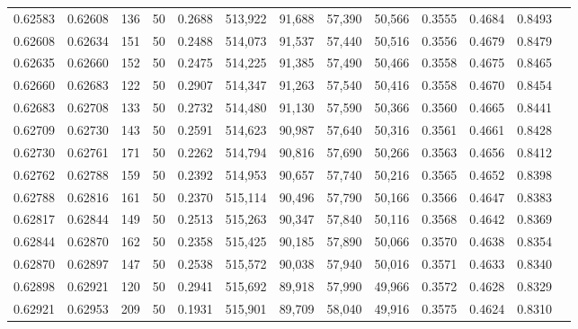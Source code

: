 \begin{tabular}{rrrrrrrrrrrrr}
0.62583 & 0.62608 &   136 &  50 &                                     0.2688 & 513,922 &  91,688 &  57,390 &  50,566 & 0.3555 & 0.4684 & 0.8493 \\
0.62608 & 0.62634 &   151 &  50 &                                     0.2488 & 514,073 &  91,537 &  57,440 &  50,516 & 0.3556 & 0.4679 & 0.8479 \\
0.62635 & 0.62660 &   152 &  50 &                                     0.2475 & 514,225 &  91,385 &  57,490 &  50,466 & 0.3558 & 0.4675 & 0.8465 \\
0.62660 & 0.62683 &   122 &  50 &                                     0.2907 & 514,347 &  91,263 &  57,540 &  50,416 & 0.3558 & 0.4670 & 0.8454 \\
0.62683 & 0.62708 &   133 &  50 &                                     0.2732 & 514,480 &  91,130 &  57,590 &  50,366 & 0.3560 & 0.4665 & 0.8441 \\
0.62709 & 0.62730 &   143 &  50 &                                     0.2591 & 514,623 &  90,987 &  57,640 &  50,316 & 0.3561 & 0.4661 & 0.8428 \\
0.62730 & 0.62761 &   171 &  50 &                                     0.2262 & 514,794 &  90,816 &  57,690 &  50,266 & 0.3563 & 0.4656 & 0.8412 \\
0.62762 & 0.62788 &   159 &  50 &                                     0.2392 & 514,953 &  90,657 &  57,740 &  50,216 & 0.3565 & 0.4652 & 0.8398 \\
0.62788 & 0.62816 &   161 &  50 &                                     0.2370 & 515,114 &  90,496 &  57,790 &  50,166 & 0.3566 & 0.4647 & 0.8383 \\
0.62817 & 0.62844 &   149 &  50 &                                     0.2513 & 515,263 &  90,347 &  57,840 &  50,116 & 0.3568 & 0.4642 & 0.8369 \\
0.62844 & 0.62870 &   162 &  50 &                                     0.2358 & 515,425 &  90,185 &  57,890 &  50,066 & 0.3570 & 0.4638 & 0.8354 \\
0.62870 & 0.62897 &   147 &  50 &                                     0.2538 & 515,572 &  90,038 &  57,940 &  50,016 & 0.3571 & 0.4633 & 0.8340 \\
0.62898 & 0.62921 &   120 &  50 &                                     0.2941 & 515,692 &  89,918 &  57,990 &  49,966 & 0.3572 & 0.4628 & 0.8329 \\
0.62921 & 0.62953 &   209 &  50 &                                     0.1931 & 515,901 &  89,709 &  58,040 &  49,916 & 0.3575 & 0.4624 & 0.8310 \\

\end{tabular}
